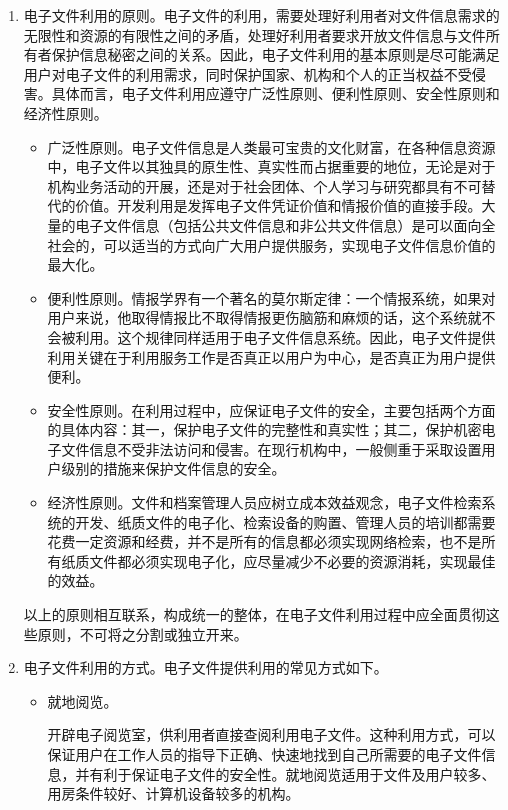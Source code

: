 \begin{enumerate}
    \item 电子文件利用的原则。电子文件的利用，需要处理好利用者对文件信息需求的无限性和资源的有限性之间的矛盾，处理好利用者要求开放文件信息与文件所有者保护信息秘密之间的关系。因此，电子文件利用的基本原则是尽可能满足用户对电子文件的利用需求，同时保护国家、机构和个人的正当权益不受侵害。具体而言，电子文件利用应遵守广泛性原则、便利性原则、安全性原则和经济性原则。
        \begin{itemize}
            \item  广泛性原则。电子文件信息是人类最可宝贵的文化财富，在各种信息资源中，电子文件以其独具的原生性、真实性而占据重要的地位，无论是对于机构业务活动的开展，还是对于社会团体、个人学习与研究都具有不可替代的价值。开发利用是发挥电子文件凭证价值和情报价值的直接手段。大量的电子文件信息（包括公共文件信息和非公共文件信息）是可以面向全社会的，可以适当的方式向广大用户提供服务，实现电子文件信息价值的最大化。
            \item  便利性原则。情报学界有一个著名的莫尔斯定律：一个情报系统，如果对用户来说，他取得情报比不取得情报更伤脑筋和麻烦的话，这个系统就不会被利用。这个规律同样适用于电子文件信息系统。因此，电子文件提供利用关键在于利用服务工作是否真正以用户为中心，是否真正为用户提供便利。
            \item  安全性原则。在利用过程中，应保证电子文件的安全，主要包括两个方面的具体内容：其一，保护电子文件的完整性和真实性；其二，保护机密电子文件信息不受非法访问和侵害。在现行机构中，一般侧重于采取设置用户级别的措施来保护文件信息的安全。
            \item  经济性原则。文件和档案管理人员应树立成本效益观念，电子文件检索系统的开发、纸质文件的电子化、检索设备的购置、管理人员的培训都需要花费一定资源和经费，并不是所有的信息都必须实现网络检索，也不是所有纸质文件都必须实现电子化，应尽量减少不必要的资源消耗，实现最佳的效益。
        \end{itemize}
    以上的原则相互联系，构成统一的整体，在电子文件利用过程中应全面贯彻这些原则，不可将之分割或独立开来。

    \item 电子文件利用的方式。电子文件提供利用的常见方式如下。
        \begin{itemize}
            \item  就地阅览。

            开辟电子阅览室，供利用者直接查阅利用电子文件。这种利用方式，可以保证用户在工作人员的指导下正确、快速地找到自己所需要的电子文件信息，并有利于保证电子文件的安全性。就地阅览适用于文件及用户较多、用房条件较好、计算机设备较多的机构。


\end{itemize}
\end{enumerate}
